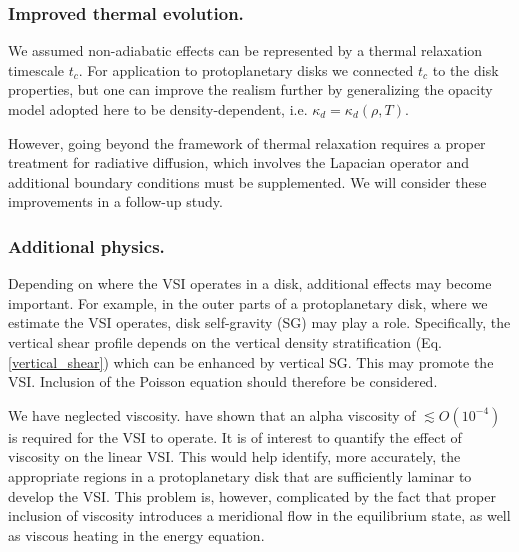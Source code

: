 
\subsubsection{Improved thermal evolution.} 
We assumed non-adiabatic effects
can be represented by a thermal relaxation timescale $t_c$. For 
application to protoplanetary disks we connected $t_c$ to the disk
properties, but one can improve the realism further by generalizing the
opacity model adopted here to be density-dependent,  i.e. $\kappa_d =
\kappa_d(\rho, T)$. 

However, going beyond the framework of thermal
relaxation requires a proper treatment for radiative diffusion, which
involves the Lapacian operator and additional boundary conditions
must be supplemented. We will consider these improvements in a
follow-up study. 
 
\subsubsection{Additional physics.} 


Depending on where the VSI operates in a
disk, additional effects may become important. For example, in the
outer parts of a protoplanetary disk, where we estimate the VSI 
operates, disk self-gravity (SG) may play a role. Specifically, the vertical
shear profile depends on the vertical density stratification
(Eq. \ref{vertical_shear}) which can be enhanced by vertical SG. This
may promote the VSI. Inclusion of the Poisson equation should
therefore be considered.  

We have neglected viscosity. \cite{nelson13} have shown that an
alpha viscosity of $\lesssim O(10^{-4})$ is required for the VSI to
operate. It is of interest to quantify the effect of viscosity
on the linear VSI. This would help identify, more accurately, the
appropriate regions in a protoplanetary disk that are sufficiently
laminar to develop the VSI.  This problem is, however, complicated by
the fact that proper inclusion of viscosity introduces a meridional
flow in the equilibrium state, as well as viscous heating
in the energy equation. 





